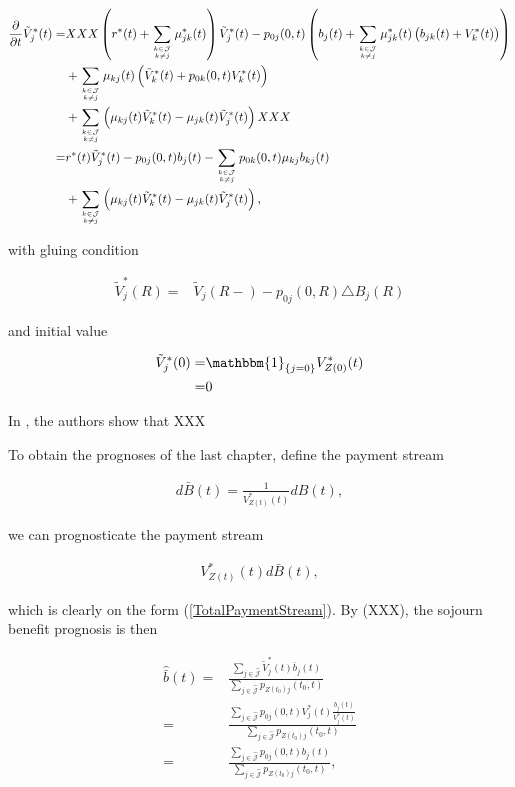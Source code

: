 \documentclass{book}
\newcommand{\1}[1]{\mathbbm{1}_{\left\lbrace #1 \right\rbrace}}
\theoremstyle{break}
\theoremstyle{remark}
\numberwithin{equation}{section}
\begin{document}
\begin{align*}
	\frac{\partial}{\partial t} \tilde{V}_j^*(t) =& XXX\left( r^*(t) + \sum_{k \in \mathcal{J} \atop k \neq j} \mu_{jk}^*(t) \right) \tilde{V}_j^*(t) - p_{0j}(0,t) \left( b_j(t) + \sum_{k \in \mathcal{J} \atop k \neq j} \mu_{jk}^*(t) \left( b_{jk}(t) + V_k^*(t) \right) \right) \\
	&+ \sum_{k \in \mathcal{J} \atop k \neq j} \mu_{kj}(t) \left( \tilde{V}_k^*(t) + p_{0k}(0,t) V_k^*(t) \right) \\
	&+ \sum_{k \in \mathcal{J} \atop k \neq j} \left( \mu_{kj}(t) \tilde{V}_k^*(t) - \mu_{jk}(t) \tilde{V}_j^*(t) \right)XXX \\
	=& r^*(t) \tilde{V}_j^*(t) - p_{0j}(0,t) b_j(t) - \sum_{k \in \mathcal{J} \atop k \neq j} p_{0k}(0,t) \mu_{kj} b_{kj}(t) \\
	&+ \sum_{k \in \mathcal{J} \atop k \neq j} \left( \mu_{kj}(t) \tilde{V}_k^*(t) - \mu_{jk}(t) \tilde{V}_j^*(t) \right),
\end{align*}

with gluing condition

\begin{align*}
\tilde{V}_j^*(R) =& \tilde{V}_j(R-) - p_{0j}(0,R) \triangle B_j(R)
\end{align*}

and initial value

\begin{align*}
\tilde{V}_j^*(0) =& \1{j=0} V_{Z(0)}^*(t) \\
=& 0
\end{align*}

In \cite{Lollike}, the authors show that XXX

To obtain the prognoses of the last chapter, define the payment stream

\begin{align*}
	d\bar{B}(t) = \frac{1}{V_{Z(t)}^*(t)}dB(t),
\end{align*}

we can prognosticate the payment stream

\begin{align*}
V_{Z(t)}^*(t) d\bar{B}(t),
\end{align*}

which is clearly on the form (\ref{TotalPaymentStream}). By (XXX), the sojourn benefit prognosis is then

\begin{align*}
\hat{\bar{b}}(t) =& \frac{\sum_{j \in \hat{\mathcal{J}}} \tilde{V}_j^*(t) \bar{b}_j(t)}{\sum_{j \in \hat{\mathcal{J}}} p_{Z(t_0)j}(t_0,t)} \\
=& \frac{\sum_{j \in \hat{\mathcal{J}}} p_{0j}(0,t) V_j^*(t) \frac{b_j(t)}{V_j^*(t)}}{\sum_{j \in \hat{\mathcal{J}}} p_{Z(t_0)j}(t_0,t)} \\
=& \frac{\sum_{j \in \hat{\mathcal{J}}} p_{0j}(0,t) b_j(t)}{\sum_{j \in \hat{\mathcal{J}}} p_{Z(t_0)j}(t_0,t)},
\end{align*}
\end{document}
